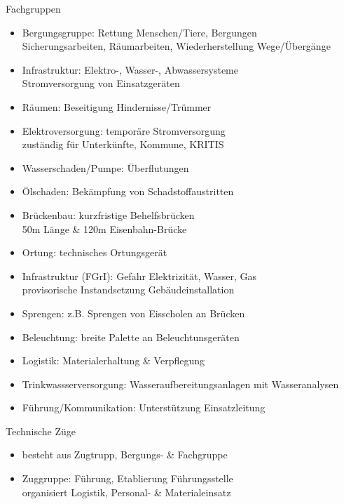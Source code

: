 \begin{sectionbox}{Fachgruppen}
    \begin{itemize}
        \item Bergungsgruppe: Rettung Menschen/Tiere, Bergungen\\
        \ra Sicherungsarbeiten, Räumarbeiten, Wiederherstellung Wege/Übergänge
        \item Infrastruktur: Elektro-, Wasser-, Abwassersysteme\\
        \ra Stromversorgung von Einsatzgeräten
        \item Räumen: Beseitigung Hindernisse/Trümmer
        \item Elektroversorgung: temporäre Stromversorgung\\
        \ra zuständig für Unterkünfte, Kommune, KRITIS
        \item Wasserschaden/Pumpe: Überflutungen
        \item Ölschaden: Bekämpfung von Schadstoffaustritten
        \item Brückenbau: kurzfristige Behelfsbrücken\\
        \ra 50m Länge \& 120m Eisenbahn-Brücke
        \item Ortung: technisches Ortungsgerät
        \item Infrastruktur (FGrI): Gefahr Elektrizität, Wasser, Gas\\
        \ra provisorische Instandsetzung Gebäudeinstallation
        \item Sprengen: z.B. Sprengen von Eisscholen an Brücken
        \item Beleuchtung: breite Palette an Beleuchtunsgeräten
        \item Logistik: Materialerhaltung \& Verpflegung
        \item Trinkwassserversorgung: Wasseraufbereitungsanlagen mit Wasseranalysen
        \item Führung/Kommunikation: Unterstützung Einsatzleitung
    \end{itemize}
\end{sectionbox}
\begin{sectionbox}{Technische Züge}
    \begin{itemize}
        \item besteht aus Zugtrupp, Bergungs- \& Fachgruppe
        \item Zuggruppe: Führung, Etablierung Führungsstelle\\
        \ra organisiert Logistik, Personal- \& Materialeinsatz
    \end{itemize}
\end{sectionbox}
